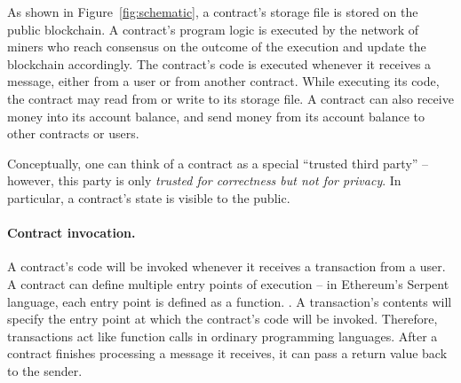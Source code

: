 \documentclass[10pt,twocolumn,letterpaper]{article}
\newcommand{\elaine}[1]{{\color{red}{[elaine: #1]}}}
\begin{document}
As shown in Figure~\ref{fig:schematic},%
a contract's storage file is stored on the public blockchain.
A contract's program logic is executed by the network of miners 
who reach consensus on the outcome of the execution  
and update the blockchain accordingly.
The contract's code is executed whenever it receives a message, 
either from a user or from another contract.
While executing its code, the contract may read from or write to its storage file.
A contract can also receive money into its account balance, and send money from its account balance to other contracts or users.




Conceptually, one can think of a contract as 
a special ``trusted third party'' -- however,
this party is only {\it trusted for correctness but not for privacy}.
In particular, a contract's state is 
visible to the public.

\paragraph{Contract invocation.} 
A contract's code will be invoked 
whenever it receives a transaction from a user.
A contract can define multiple entry points
of execution -- in Ethereum's Serpent language,
each entry point is defined as a function. \elaine{double check}. 
A transaction's contents
will specify the entry point 
at which the contract's code will be invoked.
Therefore, transactions act like function calls in ordinary programming languages. 
After a contract finishes processing a message it receives, it can pass a return value back to the sender.
\end{document}
